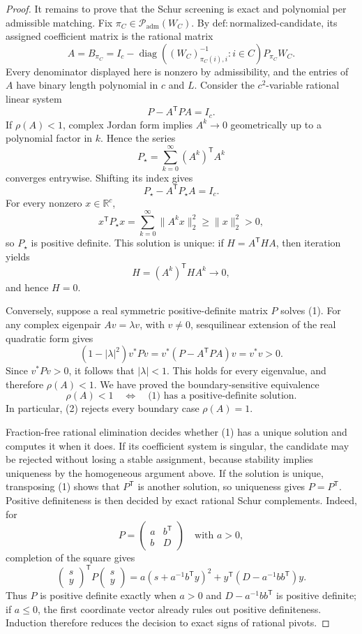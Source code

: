 \documentclass{article}
\begin{document}
\begin{proof}
It remains to prove that the Schur screening is exact and polynomial per admissible matching.  Fix \(\pi_C\in\mathcal P_{\mathrm{adm}}(W_C)\).  By \(\mathrm{def:normalized\mbox{-}candidate}\), its assigned coefficient matrix is the rational matrix
\[
 A=B_{\pi_C}
 =I_c-
   \operatorname{diag}\!\left(
   (W_C)_{\pi_C(i),i}^{-1}:i\in C\right)P_{\pi_C}W_C.
\]
Every denominator displayed here is nonzero by admissibility, and the entries of \(A\) have binary length polynomial in \(c\) and \(L\).  Consider the \(c^2\)-variable rational linear system
\[
 P-A^{\mathsf T}PA=I_c. \tag{1}
\]
If \(\rho(A)<1\), complex Jordan form implies \(A^k\to0\) geometrically up to a polynomial factor in \(k\).  Hence the series
\[
 P_\star=\sum_{k=0}^{\infty}(A^k)^{\mathsf T}A^k
\]
converges entrywise.  Shifting its index gives
\[
 P_\star-A^{\mathsf T}P_\star A=I_c.
\]
For every nonzero \(x\in\mathbb R^c\),
\[
 x^{\mathsf T}P_\star x
 =\sum_{k=0}^{\infty}\lVert A^kx\rVert_2^2
 \ge \lVert x\rVert_2^2>0,
\]
so \(P_\star\) is positive definite.  This solution is unique: if \(H=A^{\mathsf T}HA\), then iteration yields
\[
 H=(A^k)^{\mathsf T}HA^k\longrightarrow0,
\]
and hence \(H=0\).

Conversely, suppose a real symmetric positive-definite matrix \(P\) solves (1).  For any complex eigenpair \(Av=\lambda v\), with \(v\ne0\), sesquilinear extension of the real quadratic form gives
\[
 (1-|\lambda|^2)v^*Pv
 =v^*(P-A^{\mathsf T}PA)v
 =v^*v>0.
\]
Since \(v^*Pv>0\), it follows that \(|\lambda|<1\).  This holds for every eigenvalue, and therefore \(\rho(A)<1\).  We have proved the boundary-sensitive equivalence
\[
 \rho(A)<1
 \quad\Longleftrightarrow\quad
 \text{(1) has a positive-definite solution}. \tag{2}
\]
In particular, (2) rejects every boundary case \(\rho(A)=1\).

Fraction-free rational elimination decides whether (1) has a unique solution and computes it when it does.  If its coefficient system is singular, the candidate may be rejected without losing a stable assignment, because stability implies uniqueness by the homogeneous argument above.  If the solution is unique, transposing (1) shows that \(P^{\mathsf T}\) is another solution, so uniqueness gives \(P=P^{\mathsf T}\).  Positive definiteness is then decided by exact rational Schur complements.  Indeed, for
\[
 P=\begin{pmatrix}a&b^{\mathsf T}\\ b&D\end{pmatrix}
 \quad\text{with }a>0,
\]
completion of the square gives
\[
 \begin{pmatrix}s\\y\end{pmatrix}^{\!\mathsf T}
 P
 \begin{pmatrix}s\\y\end{pmatrix}
 =a\left(s+a^{-1}b^{\mathsf T}y\right)^2
  +y^{\mathsf T}\left(D-a^{-1}bb^{\mathsf T}\right)y.
\]
Thus \(P\) is positive definite exactly when \(a>0\) and \(D-a^{-1}bb^{\mathsf T}\) is positive definite; if \(a\le0\), the first coordinate vector already rules out positive definiteness.  Induction therefore reduces the decision to exact signs of rational pivots.


\end{proof}
\end{document}
